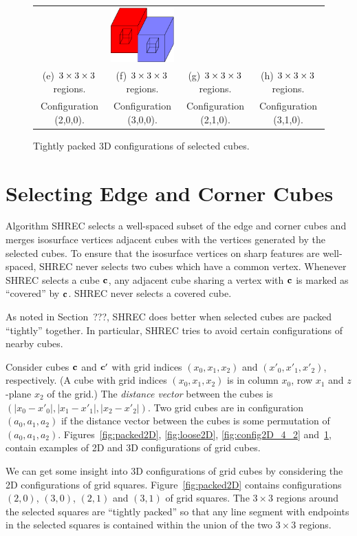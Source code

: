 \begin{figure}
\begin{tabular}{cccc}
\qquad &
\qquad
\includegraphics[width=1.2in]{images/config3D_3_1_0_3x3x3.eps} \\
(e) $3 \times 3 \times 3$ regions. & (f) $3 \times 3 \times 3$ regions. 
  & (g) $3 \times 3 \times 3$ regions. & (h) $3 \times 3 \times 3$ regions.\\
Configuration (2,0,0). & Configuration (3,0,0). 
  & Configuration (2,1,0). & Configuration (3,1,0).
\end{tabular}
\caption{Tightly packed 3D configurations of selected cubes.}
\label{fig:packed3D}
\end{figure}


\section{Selecting Edge and Corner Cubes}
\label{section:selection}

Algorithm SHREC selects a well-spaced subset of the edge and corner cubes
and merges isosurface vertices adjacent cubes 
with the vertices generated by the selected cubes.
To ensure that the isosurface vertices on sharp features are well-spaced,
SHREC never selects two cubes which have a common vertex.
Whenever SHREC selects a cube $\mathbf{c}$,
any adjacent cube sharing a vertex with $\mathbf{c}$ is marked as ``covered''
by $\mathbf{c}$.
SHREC never selects a covered cube.

As noted in Section~???, 
SHREC does better when selected cubes 
are packed ``tightly'' together.
In particular, SHREC tries to avoid certain configurations of nearby cubes.

Consider cubes $\mathbf{c}$ and $\mathbf{c}'$ with grid indices $(x_0,x_1,x_2)$
and $(x'_0,x'_1,x'_2)$, respectively.
(A cube with grid indices $(x_0,x_1,x_2)$ is in column $x_0$, row $x_1$
and $z$-plane $x_2$ of the grid.)
The {\em distance vector} between the cubes is
$(|x_0-x'_0|, |x_1-x'_1|, |x_2-x'_2|)$.
Two grid cubes are in configuration $(a_0,a_1,a_2)$ if the distance vector
between the cubes is some permutation of $(a_0,a_1,a_2)$.
Figures~\ref{fig:packed2D}, \ref{fig:loose2D}, \ref{fig:config2D_4_2}
and~\ref{fig:packed3D},
contain examples of 2D and 3D configurations of grid cubes.

We can get some insight into 3D configurations of grid cubes
by considering the 2D configurations of grid squares.
Figure~\ref{fig:packed2D} contains configurations $(2,0)$, $(3,0)$,
$(2,1)$ and $(3,1)$ of grid squares.
The $3 \times 3$ regions around the selected squares are ``tightly packed''
so that any line segment with endpoints in the selected squares
is contained within the union of the two $3 \times 3$ regions.

